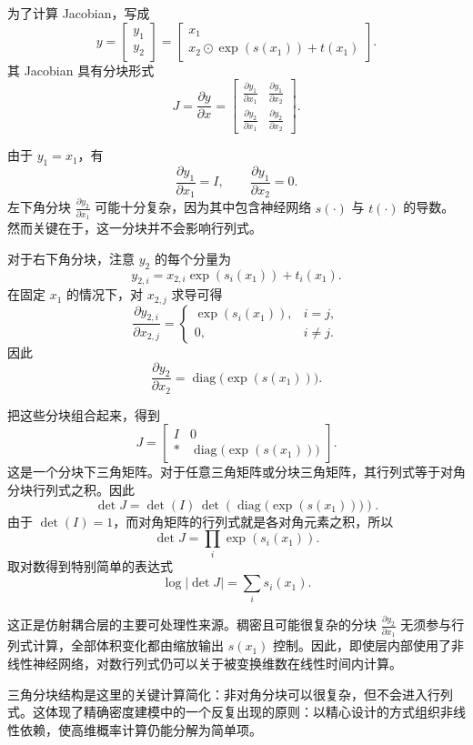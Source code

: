 为了计算 Jacobian，写成
\[
y=
\begin{bmatrix}
y_1\\
y_2
\end{bmatrix}
=
\begin{bmatrix}
x_1\\
x_2\odot \exp(s(x_1))+t(x_1)
\end{bmatrix}.
\]
其 Jacobian 具有分块形式
\[
J
=
\frac{\partial y}{\partial x}
=
\begin{bmatrix}
\frac{\partial y_1}{\partial x_1}
&
\frac{\partial y_1}{\partial x_2}
\\[4pt]
\frac{\partial y_2}{\partial x_1}
&
\frac{\partial y_2}{\partial x_2}
\end{bmatrix}.
\]

由于 $y_1=x_1$，有
\[
\frac{\partial y_1}{\partial x_1}=I,
\qquad
\frac{\partial y_1}{\partial x_2}=0.
\]
左下角分块 $\frac{\partial y_2}{\partial x_1}$ 可能十分复杂，因为其中包含神经网络 $s(\cdot)$ 与 $t(\cdot)$ 的导数。然而关键在于，这一分块并不会影响行列式。

对于右下角分块，注意 $y_2$ 的每个分量为
\[
y_{2,i}
=
x_{2,i}\exp(s_i(x_1))+t_i(x_1).
\]
在固定 $x_1$ 的情况下，对 $x_{2,j}$ 求导可得
\[
\frac{\partial y_{2,i}}{\partial x_{2,j}}
=
\begin{cases}
\exp(s_i(x_1)), & i=j,\\
0, & i\neq j.
\end{cases}
\]
因此
\[
\frac{\partial y_2}{\partial x_2}
=
\operatorname{diag}\!\big(\exp(s(x_1))\big).
\]

把这些分块组合起来，得到
\[
J
=
\begin{bmatrix}
I & 0\\
* & \operatorname{diag}\!\big(\exp(s(x_1))\big)
\end{bmatrix}.
\]
这是一个分块下三角矩阵。对于任意三角矩阵或分块三角矩阵，其行列式等于对角分块行列式之积。因此
\[
\det J
=
\det(I)\,
\det\!\left(
\operatorname{diag}\!\big(\exp(s(x_1))\big)
\right).
\]
由于 $\det(I)=1$，而对角矩阵的行列式就是各对角元素之积，所以
\[
\det J
=
\prod_i \exp(s_i(x_1)).
\]
取对数得到特别简单的表达式
\[
\boxed{
\log|\det J|
=
\sum_i s_i(x_1).
}
\]

这正是仿射耦合层的主要可处理性来源。稠密且可能很复杂的分块 $\frac{\partial y_2}{\partial x_1}$ 无须参与行列式计算，全部体积变化都由缩放输出 $s(x_1)$ 控制。因此，即使层内部使用了非线性神经网络，对数行列式仍可以关于被变换维数在线性时间内计算。

三角分块结构是这里的关键计算简化：非对角分块可以很复杂，但不会进入行列式。这体现了精确密度建模中的一个反复出现的原则：以精心设计的方式组织非线性依赖，使高维概率计算仍能分解为简单项。

